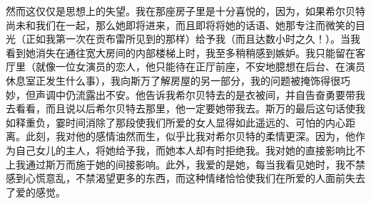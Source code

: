 \par 然而这仅仅是思想上的失望。我在那座房子里是十分喜悦的，因为，如果希尔贝特尚未和我们在一起，那么她即将进来，而且即将将她的话语、她那专注而微笑的目光（正如我第一次在贡布雷所见到的那样）给予我（而且达数小时之久！）。当我看到她消失在通往宽大房间的内部楼梯上时，我至多稍稍感到嫉妒。我只能留在客厅里（就像一位女演员的恋人，他只能待在正厅前座，不安地臆想在后台、在演员休息室正发生什么事），我向斯万了解房屋的另一部分，我的问题被掩饰得很巧妙，但声调中仍流露出不安。他告诉我希尔贝特去的是衣被间，并自告奋勇要带我去看看，而且说以后希尔贝特去那里，他一定要她带我去。斯万的最后这句话使我如释重负，霎时间消除了那段使我们所爱的女人显得如此遥远的、可怕的内心距离。此刻，我对他的感情油然而生，似乎比我对希尔贝特的柔情更深。因为，他作为自己女儿的主人，将她给予我，而她本人却有时拒绝我。我对她的直接影响比不上我通过斯万而施于她的间接影响。此外，我爱的是她，每当我看见她时，我不禁感到心慌意乱，不禁渴望更多的东西，而这种情绪恰恰使我们在所爱的人面前失去了爱的感觉。
